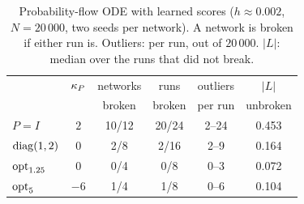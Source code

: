 \begin{table}[t]
\caption{Probability-flow ODE \Sc{} with learned scores ($h\approx0.002$, $N=20\,000$, two seeds per network). A network is broken if either run is. Outliers: per run, out of $20\,000$. $|L|$: median over the runs that did not break.}
\label{tab:ode}
\begin{ruledtabular}
\begin{tabular}{lccccc}
 & $\kappa_P$ & networks & runs & outliers & $|L|$ \\
 & & broken & broken & per run & unbroken \\
\hline
$P=I$ & $2$ & 10/12 & 20/24 & 2--24 & 0.453 \\
$\mathrm{diag}(1,2)$ & $0$ & 2/8 & 2/16 & 2--9 & 0.164 \\
$\mathrm{opt}_{1.25}$ & $0$ & 0/4 & 0/8 & 0--3 & 0.072 \\
$\mathrm{opt}_{5}$ & $-6$ & 1/4 & 1/8 & 0--6 & 0.104 \\
\end{tabular}
\end{ruledtabular}
\end{table}
